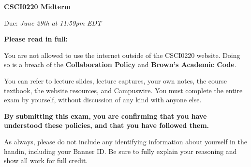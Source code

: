 \documentclass[12pt,letterpaper]{article}
\begin{document}
  \thispagestyle{firstpagestyle}
  \begin{center}
    {\huge \textbf{CSCI0220 Midterm}}

    {\large Due: \textit{June 29th at 11:59pm EDT}}
  \end{center}
  
 {\large \textbf{Please read in full:}}
 
You are not allowed to use the internet outside of the CSCI0220 website. Doing so is a breach of the \textbf{Collaboration Policy} and \textbf{Brown's Academic Code}.

You can refer to lecture slides, lecture captures, your own notes, the course textbook, the website resources, and Campuswire. You must complete the entire exam by yourself, without discussion of any kind with anyone else.

\textbf{By submitting this exam, you are confirming that you have understood these policies, and that you have followed them.}

As always, please do not include any identifying information about yourself in the handin, including your Banner ID. Be sure to fully explain your reasoning and show all work for full credit.
\end{document}
